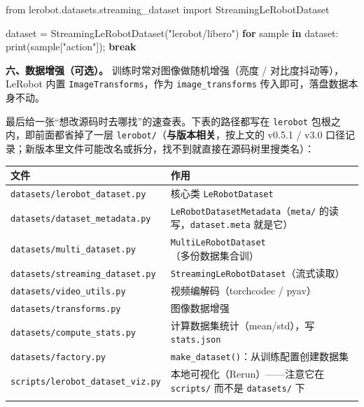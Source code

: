 \documentclass[
  chinese,
]{ctexart}
\newenvironment{Shaded}{\begin{snugshade}}{\end{snugshade}}
\newcommand{\BuiltInTok}[1]{\textcolor[rgb]{0.00,0.23,0.31}{#1}}
\newcommand{\ControlFlowTok}[1]{\textcolor[rgb]{0.00,0.23,0.31}{\textbf{#1}}}
\newcommand{\ImportTok}[1]{\textcolor[rgb]{0.00,0.46,0.62}{#1}}
\newcommand{\KeywordTok}[1]{\textcolor[rgb]{0.00,0.23,0.31}{\textbf{#1}}}
\newcommand{\NormalTok}[1]{\textcolor[rgb]{0.00,0.23,0.31}{#1}}
\newcommand{\OperatorTok}[1]{\textcolor[rgb]{0.37,0.37,0.37}{#1}}
\newcommand{\StringTok}[1]{\textcolor[rgb]{0.13,0.47,0.30}{#1}}
\begin{document}
\begin{Shaded}
\begin{Highlighting}[]
\ImportTok{from}\NormalTok{ lerobot.datasets.streaming\_dataset }\ImportTok{import}\NormalTok{ StreamingLeRobotDataset}

\NormalTok{dataset }\OperatorTok{=}\NormalTok{ StreamingLeRobotDataset(}\StringTok{"lerobot/libero"}\NormalTok{)}
\ControlFlowTok{for}\NormalTok{ sample }\KeywordTok{in}\NormalTok{ dataset:}
    \BuiltInTok{print}\NormalTok{(sample[}\StringTok{"action"}\NormalTok{])}\OperatorTok{;} \ControlFlowTok{break}
\end{Highlighting}
\end{Shaded}

\textbf{六、数据增强（可选）。} 训练时常对图像做随机增强（亮度 /
对比度抖动等），LeRobot 内置 \texttt{ImageTransforms}，作为
\texttt{image\_transforms} 传入即可，落盘数据本身不动。

最后给一张``想改源码时去哪找''的速查表。下表的路径都写在
\texttt{lerobot} 包根之内，即前面都省掉了一层
\texttt{lerobot/}（\textbf{与版本相关}，按上文的 v0.5.1 / v3.0
口径记录；新版本里文件可能改名或拆分，找不到就直接在源码树里搜类名）：

\begin{center}
\begin{tabular}{@{}>{\raggedright\arraybackslash}p{} >{\raggedright\arraybackslash}p{}@{}}
\toprule\noalign{}
文件 & 作用 \\
\midrule\noalign{}
\texttt{datasets/lerobot\_\allowbreak dataset.py} & 核心类 \texttt{LeRobotDataset} \\
\texttt{datasets/dataset\_\allowbreak metadata.py} & \texttt{LeRobotDatasetMetadata}（\texttt{meta/} 的读写，\texttt{dataset.meta} 就是它） \\
\texttt{datasets/multi\_\allowbreak dataset.py} & \texttt{MultiLeRobotDataset}（多份数据集合训） \\
\texttt{datasets/streaming\_\allowbreak dataset.py} & \texttt{StreamingLeRobotDataset}（流式读取） \\
\texttt{datasets/video\_\allowbreak utils.py} & 视频编解码（torchcodec / pyav） \\
\texttt{datasets/transforms.py} & 图像数据增强 \\
\texttt{datasets/compute\_\allowbreak stats.py} & 计算数据集统计（mean/std），写 \texttt{stats.json} \\
\texttt{datasets/factory.py} & \texttt{make\_\allowbreak dataset()}：从训练配置创建数据集 \\
\texttt{scripts/lerobot\_\allowbreak dataset\_\allowbreak viz.py} & 本地可视化（Rerun）------注意它在 \texttt{scripts/} 而不是 \texttt{datasets/} 下 \\
\bottomrule\noalign{}
\end{tabular}
\end{center}
\end{document}

